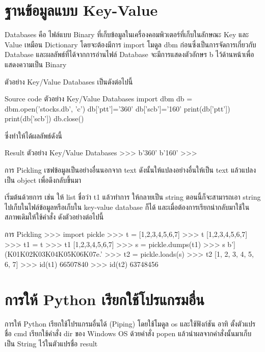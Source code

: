 \section{ฐานข้อมูลแบบ Key-Value}

Databases คือ ไฟล์แบบ Binary ที่เก็บข้อมูลในเครื่องคอมพิวเตอร์ที่เก็บในลักษณะ Key และ Value เหมือน Dictionary โดยจะต้องมีการ import โมดูล dbm ก่อนซึ่งเป็นการจัดการเกี่ยวกับ Database และผลลัพธ์ที่ได้จากการอ่านไฟล์ Database จะมีการแสดงตัวอักษร b ไว้ด้านหน้าเพื่อแสดงความเป็น Binary 

ตัวอย่าง Key/Value Databases เป็นดังต่อไปนี้

\begin{codelist}{Source code ตัวอย่าง Key/Value Databases}{}
import dbm
db = dbm.open('stocks.db', 'c')
db['ptt']='360'
db['scb']='160'
print(db['ptt'])
print(db['scb'])
db.close()
\end{codelist}

ซึ่งทำให้ได้ผลลัพธ์ดังนี้

\begin{codelist}{Result ตัวอย่าง Key/Value Databases}{}
>>>
b'360'
b'160'
>>>
\end{codelist}


การ Pickling เซฟข้อมูลเป็นอย่างอื่นนอกจาก text ดังนั้นให้แปลงอย่างอื่นให้เป็น text แล้วแปลงเป็น object เพื่อดึงกลับขึ้นมา

เริ่มต้นด้วยการ  เช่น ให้ list ชื่อว่า t1 แล้วทำการ  ให้กลายเป็น string ตอนนี้ก็จะสามารถเอา string ไปเก็บในไฟล์ข้อมูลหรือเก็บใน key-value database ก็ได้ และเมื่อต้องการเรียกนำกลับมาใช้ในสภาพเดิมให้ใช้คำสั่ง  ดังตัวอย่างต่อไปนี้ 

\begin{codelist}{การ Pickling}{}
>>> import pickle
>>> t = [1,2,3,4,5,6,7]
>>> t
[1,2,3,4,5,6,7]
>>> t1 = t
>>> t1
[1,2,3,4,5,6,7]
>>> s = pickle.dumps(t1)
>>> s
 b']
 (K\x01K\x02K\x03K\x04K\x05K\x06K\x07e.'
>>> t2 = pickle.loads(s)
>>> t2
[1, 2, 3, 4, 5, 6, 7]
>>> id(t1)
66507840
>>> id(t2)
63748456
\end{codelist}



\section{การให้ Python เรียกใช้โปรแกรมอื่น}

การให้ Python เรียกใช้โปรแกรมอื่นได้ (Piping) โดยใช้โมดูล os และใช้ฟังก์ชัน   อาทิ ตั้งตัวแปรชื่อ cmd เรียกใช้คำสั่ง dir ของ Windows OS ด้วยคำสั่ง popen แล้วนำผลจากคำสั่งนั้นมาเก็บเป็น String ไว้ในตัวแปรชื่อ result 

